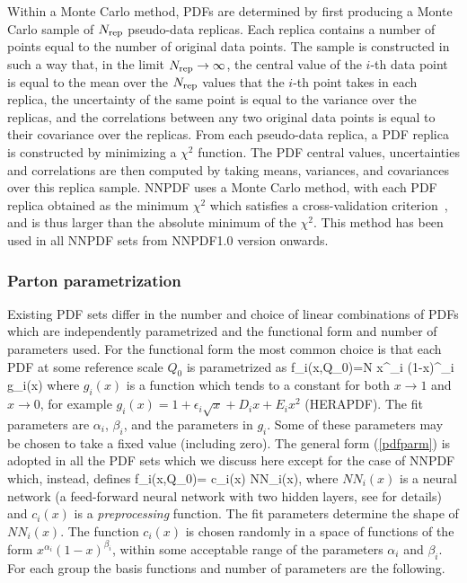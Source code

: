 Within a Monte Carlo method, PDFs are determined by first producing a
Monte Carlo sample of $N_{\rm rep}$ pseudo-data replicas. Each replica
contains a number of points equal to the number of original data
points.
 The sample is constructed
in such a way that, in the limit $N_{\rm rep}\to\infty$, 
the central value of the $i$-th
data point is equal to the mean over the $N_{\rm rep}$ values that the
$i$-th point takes in each replica,  the uncertainty of the
same point is  equal to the variance over the
replicas, and the correlations between any two original data
points is equal to their covariance over the replicas. From 
each pseudo-data replica, a PDF replica  is constructed by minimizing
a $\chi^2$ function. The PDF
central values, uncertainties and correlations are then computed by
taking means, variances, and covariances over this replica
sample. NNPDF uses a Monte Carlo method, with each PDF replica
obtained as the minimum $\chi^2$ which satisfies a cross-validation
criterion~\cite{Ball:2008by,Ball:2010de}, and is thus larger than the
absolute minimum of the $\chi^2$. This method has been used in all NNPDF sets
from NNPDF1.0 version onwards. 

\subsubsection{Parton parametrization}
\label{parm}
Existing PDF sets differ in the number and choice of linear combinations 
of PDFs which are independently parametrized and the functional form and 
number of parameters used.
For the functional form the most common choice is that
each PDF at some reference scale $Q_0$ is parametrized as
\beq
f_i(x,Q_0)=N x^{\alpha_i} (1-x)^{\beta_i} g_i(x)
\label{pdfparm}
\eeq
where $g_i(x)$ is a function which tends to a constant for both $x\to1$
and $x\to0$, for example $g_i(x)=1+ \epsilon_i \sqrt{x}+ D_i x+ E_i x^2$ (HERAPDF). The fit parameters are $\alpha_i$, $\beta_i$, and the
parameters in $g_i$. Some of these parameters may be chosen to take a
fixed value (including zero).
The general form (\ref{pdfparm})  is adopted in
all the PDF sets which we discuss here except for the case of NNPDF which, instead, defines
\beq
f_i(x,Q_0)= c_i(x) NN_i(x),
\label{pdfparmnn}
\eeq
where $NN_i(x)$ is a neural network (a feed-forward neural network
with two hidden layers, see
 for details)
and $c_i(x)$ is  a
{\em preprocessing} function. The fit parameters determine the shape 
of $NN_i(x)$. The function $c_i(x)$
is chosen randomly in a space of functions of
the form $x^{\alpha_i} (1-x)^{\beta_i}$, within some acceptable range of
the parameters $\alpha_i$ and $\beta_i$.
For each group the basis functions and number of parameters are the following.

